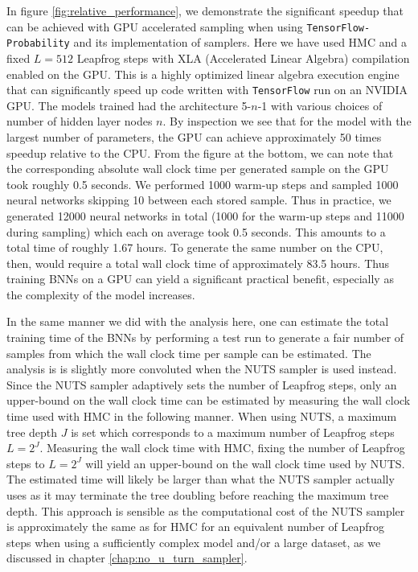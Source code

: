 In figure \ref{fig:relative_performance}, we demonstrate the significant speedup that can be achieved
with GPU accelerated sampling when using {\tt TensorFlow-Probability} and its implementation of samplers. Here we have used HMC and a fixed $L = 512$ Leapfrog steps with XLA (Accelerated Linear Algebra) compilation enabled on the GPU. This is a highly optimized linear algebra execution engine that can significantly speed up code written with {\tt TensorFlow} run on an NVIDIA GPU. The models trained had the architecture 5-$n$-1 with various choices of number of hidden layer nodes $n$.
By inspection we see that for the model with the largest number of parameters, the GPU can achieve approximately 50 times speedup relative to the CPU.
From the figure at the bottom, we can note that the corresponding absolute wall clock time per generated sample on the GPU took roughly 0.5 seconds. We performed 1000 warm-up steps and sampled 1000 neural networks skipping 10 between each stored sample. Thus in practice, we generated 12000 neural networks in total (1000 for the warm-up steps and 11000 during sampling) which each on average took 0.5 seconds. This amounts to a total time of roughly 1.67 hours. To generate the same number on the CPU, then, would require a total wall clock time of approximately 83.5 hours. Thus training BNNs on a GPU can yield a significant practical benefit, especially as the complexity of the model increases. 

In the same manner we did with the analysis here, one can estimate the total training time of the BNNs by performing a test run to generate a fair number of samples from which the wall clock time per sample can be estimated. The analysis is is slightly more convoluted when the NUTS sampler is used instead. Since the NUTS sampler adaptively sets the number of Leapfrog steps, only an upper-bound on the wall clock time can be estimated by measuring the wall clock time used with HMC in the following manner. When using NUTS, a maximum tree depth $J$ is set which corresponds to a maximum number of Leapfrog steps $L = 2^J$. Measuring the wall clock time with HMC, fixing the number of Leapfrog steps to $L = 2^J$ will yield an upper-bound on the wall clock time used by NUTS. The estimated time will likely be larger than what the NUTS sampler actually uses as it may terminate the tree doubling before reaching the maximum tree depth. This approach is sensible as the computational cost of the NUTS sampler is approximately the same as for HMC for an equivalent number of Leapfrog steps when using a sufficiently complex model and/or a large dataset, as we discussed in chapter \ref{chap:no_u_turn_sampler}.


